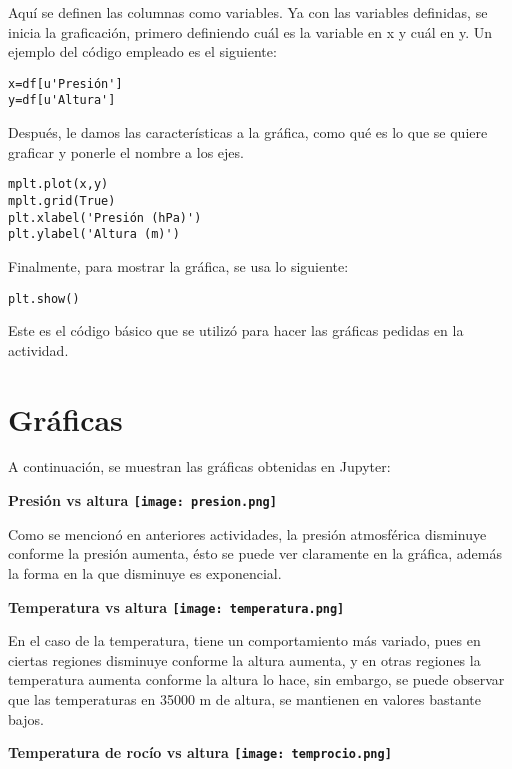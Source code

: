 \documentclass[12pt]{article}
\begin{document}
\begin{doublespace}
Aquí se definen las columnas como variables. Ya con las variables definidas, se inicia la graficación, primero definiendo cuál es la variable en x y cuál en y. Un ejemplo del código empleado es el siguiente:

\begin{verbatim}
x=df[u'Presión']
y=df[u'Altura']
\end{verbatim}

Después, le damos las características a la gráfica, como qué es lo que se quiere graficar y ponerle el nombre a los ejes.

\begin{verbatim}
mplt.plot(x,y)
mplt.grid(True)
plt.xlabel('Presión (hPa)')
plt.ylabel('Altura (m)')
\end{verbatim}

Finalmente, para mostrar la gráfica, se usa lo siguiente:

\begin{verbatim}
plt.show()
\end{verbatim}

Este es el código básico que se utilizó para hacer las gráficas pedidas en la actividad.

\section{Gráficas}
A continuación, se muestran las gráficas obtenidas en Jupyter:

\begin{center} \bfseries Presión vs altura
\texttt{[image: presion.png]}
\end{center} 

Como se mencionó en anteriores actividades, la presión atmosférica disminuye conforme la presión aumenta, ésto se puede ver claramente en la gráfica, además la forma en la que disminuye es exponencial.

\begin{center} \bfseries Temperatura vs altura
\texttt{[image: temperatura.png]}
\end{center}

En el caso de la temperatura, tiene un comportamiento más variado, pues en ciertas regiones disminuye conforme la altura aumenta, y en otras regiones la temperatura aumenta conforme la altura lo hace, sin embargo, se puede observar que las temperaturas en 35000 m de altura, se mantienen en valores bastante bajos.

\begin{center}
\bfseries Temperatura de rocío vs altura
\texttt{[image: temprocio.png]}
\end{center}


\end{doublespace}
\end{document}
